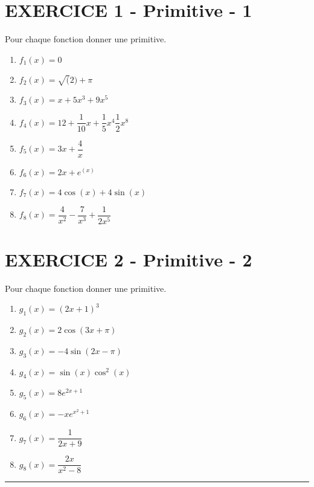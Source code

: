 \documentclass[11pt]{article}
\begin{document}
\setlength{\columnseprule}{1pt}

\begin{multicols}{2}

  \section*{EXERCICE 1 - Primitive - 1}
  Pour chaque fonction donner une primitive.

  \begin{enumerate}
  \item $f_{1}(x) = 0$
  \item $f_{2}(x) = \sqrt(2) + \pi$
  \item $f_{3}(x) = x + 5x^3 + 9 x^5$
  \item $f_{4}(x) = 12 + \dfrac{1}{10}x + \dfrac{1}{5}x^{4} \dfrac{1}{2}x^{8}$
  \item $f_{5}(x) = 3x + \dfrac{4}{x}$ 
  \item $f_{6}(x) = 2x + e^(x)$
  \item $f_{7}(x) = 4\cos(x) + 4\sin(x)$
  \item $f_{8}(x) = \dfrac{4}{x^2} - \dfrac{7}{x^3} + \dfrac{1}{2x^5}$
  \end{enumerate}

  \section*{EXERCICE 2 - Primitive - 2}
  Pour chaque fonction donner une primitive.

  \begin{enumerate}
  \item $g_{1}(x) = (2x +1)^3$
  \item $g_{2}(x) =  2 \cos(3x + \pi)$
  \item $g_{3}(x) = -4 \sin(2x - \pi)$
  \item $g_{4}(x) = \sin(x) \cos^{2}(x)$
  \item $g_{5}(x) = 8 e^{2x + 1}$ 
  \item $g_{6}(x) = -x e^{x^2 + 1}$
  \item $g_{7}(x) = \dfrac{1}{2x + 9}$
  \item $g_{8}(x) = \dfrac{2x}{x^2 - 8}$
  \end{enumerate}

\end{multicols}

\rule{\textwidth}{1pt}
\end{document}
